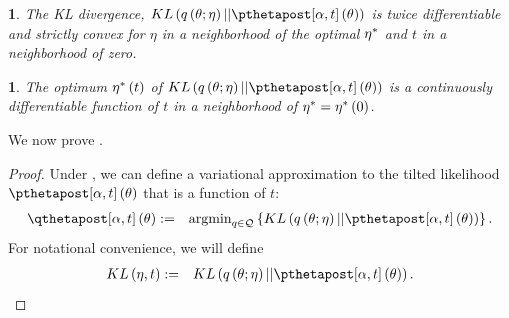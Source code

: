 \documentclass{article}\usepackage[]{graphicx}\usepackage[]{color}
\theoremstyle{plain}
\theoremstyle{definition}
\theoremstyle{plain}
\theoremstyle{plain}
\newtheorem{assumption}[thm]{\protect\assumptionname}
\theoremstyle{plain}
\theoremstyle{plain}
\providecommand{\assumptionname}{Assumption}
\begin{document}
\begin{assumption}
The KL divergence, $KL\left(q\left(\theta;\eta\right)||\ptthetapost\left(\theta\right)\right)$
is twice differentiable and strictly convex for $\eta$ in a neighborhood
of the optimal $\eta^{*}$ and $t$ in a neighborhood of zero. \label{assu:kl_nice}
\end{assumption}

\begin{assumption}
The optimum $\eta^{*}\left(t\right)$ of $KL\left(q\left(\theta;\eta\right)||\ptthetapost\left(\theta\right)\right)$
is a continuously differentiable function of $t$ in a neighborhood
of $\eta^{*}=\eta^{*}\left(0\right)$.\label{assu:eta_t_smooth}
\end{assumption}

We now prove .
\begin{proof}
Under , we can define a variational approximation
to the tilted likelihood $\ptthetapost\left(\theta\right)$ that is
a function of $t$: 
\begin{eqnarray*}
\qtthetapost\left(\theta\right) & := & \textrm{argmin}_{q\in\mathcal{Q}}\left\{ KL\left(q\left(\theta;\eta\right)||\ptthetapost\left(\theta\right)\right)\right\} .
\end{eqnarray*}
 For notational convenience, we will define 
\begin{eqnarray*}
KL\left(\eta,t\right) & := & KL\left(q\left(\theta;\eta\right)||\ptthetapost\left(\theta\right)\right).
\end{eqnarray*}


\end{proof}
\end{document}
